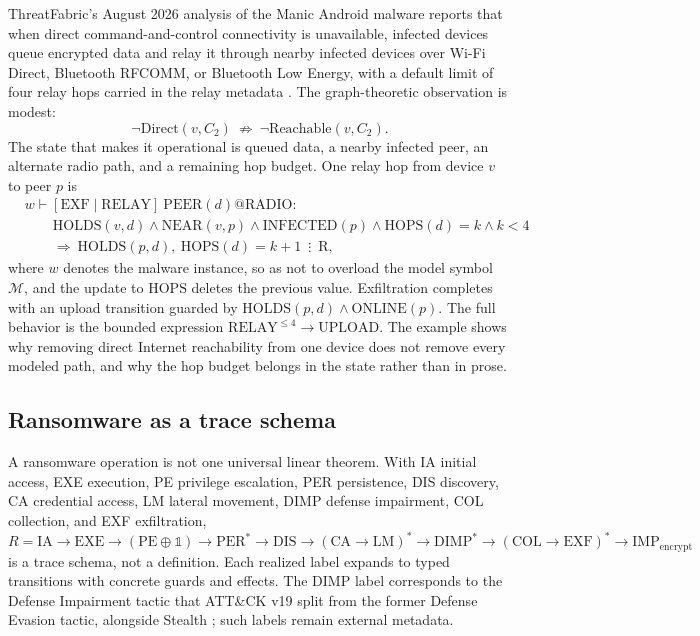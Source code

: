 \documentclass[11pt,letterpaper]{article}
\theoremstyle{definition}
\newcommand{\Mod}{\mathcal{M}}
\newcommand{\evsep}{\mathrel{\vdots}}
\begin{document}
ThreatFabric's August 2026 analysis of the Manic Android malware reports that when direct command-and-control connectivity is unavailable, infected devices queue encrypted data and relay it through nearby infected devices over Wi-Fi Direct, Bluetooth RFCOMM, or Bluetooth Low Energy, with a default limit of four relay hops carried in the relay metadata \cite{manic}. The graph-theoretic observation is modest:
\begin{equation}
\neg\mathrm{Direct}(v,C_2)\ \not\Rightarrow\ \neg\mathrm{Reachable}(v,C_2).
\end{equation}
The state that makes it operational is queued data, a nearby infected peer, an alternate radio path, and a remaining hop budget. One relay hop from device $v$ to peer $p$ is
\begin{equation}
\begin{aligned}
&w\vdash[\mathrm{EXF}\mid\mathrm{RELAY}]\ \mathrm{PEER}(d)@\mathrm{RADIO}:\\
&\qquad \mathrm{HOLDS}(v,d)\wedge\mathrm{NEAR}(v,p)\wedge\mathrm{INFECTED}(p)\wedge\mathrm{HOPS}(d)=k\wedge k<4\\
&\qquad\Rightarrow\ \mathrm{HOLDS}(p,d),\ \mathrm{HOPS}(d)=k{+}1\ \evsep\ \mathrm{R},
\end{aligned}
\end{equation}
where $w$ denotes the malware instance, so as not to overload the model symbol $\Mod$, and the update to $\mathrm{HOPS}$ deletes the previous value. Exfiltration completes with an upload transition guarded by $\mathrm{HOLDS}(p,d)\wedge\mathrm{ONLINE}(p)$. The full behavior is the bounded expression $\mathrm{RELAY}^{\le 4}\rightarrow\mathrm{UPLOAD}$. The example shows why removing direct Internet reachability from one device does not remove every modeled path, and why the hop budget belongs in the state rather than in prose.

\subsection{Ransomware as a trace schema}

A ransomware operation is not one universal linear theorem. With IA initial access, EXE execution, PE privilege escalation, PER persistence, DIS discovery, CA credential access, LM lateral movement, DIMP defense impairment, COL collection, and EXF exfiltration,
\begin{equation}
R=\mathrm{IA}\rightarrow\mathrm{EXE}\rightarrow(\mathrm{PE}\oplus\mathbb{1})\rightarrow\mathrm{PER}^{*}\rightarrow\mathrm{DIS}\rightarrow(\mathrm{CA}\rightarrow\mathrm{LM})^{*}\rightarrow\mathrm{DIMP}^{*}\rightarrow(\mathrm{COL}\rightarrow\mathrm{EXF})^{*}\rightarrow\mathrm{IMP}_{\mathrm{encrypt}}
\end{equation}
is a trace schema, not a definition. Each realized label expands to typed transitions with concrete guards and effects. The DIMP label corresponds to the Defense Impairment tactic that ATT\&CK v19 split from the former Defense Evasion tactic, alongside Stealth \cite{attack}; such labels remain external metadata.
\end{document}
